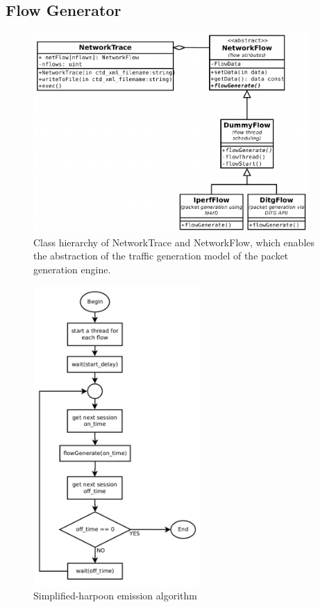 

\subsection{Flow Generator}

\begin{figure}[ht!]
    \centering
    \includegraphics[height=3.0in]{figures/ch3/trace-flow}
    \caption{Class hierarchy of NetworkTrace and NetworkFlow, which enables the abstraction of the traffic generation model of the packet generation engine.}
    \label{fig:network-trace-flow-class-diagram}
\end{figure}

\begin{figure}[ht!]
    \centering
    \includegraphics[height=4.5in]{figures/ch3/alg-simplified-harpoon}
    \caption{Simplified-harpoon emission algorithm}
    \label{fig:alg-simplified-harpoon}
\end{figure}


